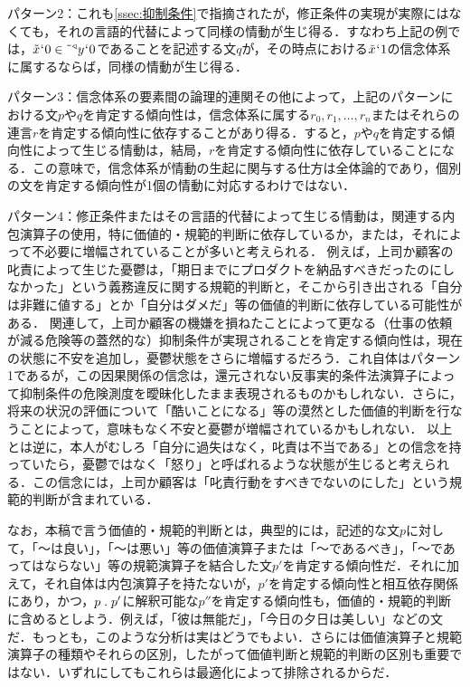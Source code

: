 パターン2：これも\ref{ssec:抑制条件}で指摘されたが，修正条件の実現が実際にはなくても，それの言語的代替によって同様の情動が生じ得る．すなわち上記の例では，$\tilde{x}{\mspace{1mu}{`}\mspace{1mu}} 0\in\tilde{\:\:}{^\triangleleft}y{\mspace{1mu}{`}\mspace{1mu}} 0$であることを記述する文$q$が，その時点における$ \tilde{x}{\mspace{1mu}{`}\mspace{1mu}} 1 $の信念体系に属するならば，同様の情動が生じ得る．

パターン3：信念体系の要素間の論理的連関その他によって，上記のパターンにおける文$p$や$q$を肯定する傾向性は，信念体系に属する$ r_0,r_1,\dots,r_n $またはそれらの連言$r$を肯定する傾向性に依存することがあり得る．すると，$p$や$q$を肯定する傾向性によって生じる情動は，結局，$r$を肯定する傾向性に依存していることになる．この意味で，信念体系が情動の生起に関与する仕方は全体論的であり，個別の文を肯定する傾向性が1個の情動に対応するわけではない．

パターン4：修正条件またはその言語的代替によって生じる情動は，関連する内包演算子の使用，特に価値的・規範的判断に依存しているか，または，それによって不必要に増幅されていることが多いと考えられる．
例えば，上司か顧客の叱責によって生じた憂鬱は，「期日までにプロダクトを納品すべきだったのにしなかった」という義務違反に関する規範的判断と，そこから引き出される「自分は非難に値する」とか「自分はダメだ」等の価値的判断に依存している可能性がある．
関連して，上司か顧客の機嫌を損ねたことによって更なる（仕事の依頼が減る危険等の蓋然的な）抑制条件が実現されることを肯定する傾向性は，現在の状態に不安を追加し，憂鬱状態をさらに増幅するだろう．これ自体はパターン1であるが，この因果関係の信念は，還元されない反事実的条件法演算子によって抑制条件の危険測度を曖昧化したまま表現されるものかもしれない．さらに，将来の状況の評価について「酷いことになる」等の漠然とした価値的判断を行なうことによって，意味もなく不安と憂鬱が増幅されているかもしれない．
以上とは逆に，本人がむしろ「自分に過失はなく，叱責は不当である」との信念を持っていたら，憂鬱ではなく「怒り」と呼ばれるような状態が生じると考えられる．この信念には，上司か顧客は「叱責行動をすべきでないのにした」という規範的判断が含まれている．

なお，本稿で言う価値的・規範的判断とは，典型的には，記述的な文$p$に対して，「〜は良い」，「〜は悪い」等の価値演算子または「〜であるべき」，「〜であってはならない」等の規範演算子を結合した文$p'$を肯定する傾向性だ．それに加えて，それ自体は内包演算子を持たないが，$p'$を肯定する傾向性と相互依存関係にあり，かつ，$p\con{1}p'$に解釈可能な$p''$を肯定する傾向性も，価値的・規範的判断に含めるとしよう．例えば，「彼は無能だ」，「今日の夕日は美しい」などの文だ．もっとも，このような分析は実はどうでもよい．さらには価値演算子と規範演算子の種類やそれらの区別，したがって価値判断と規範的判断の区別も重要ではない．いずれにしてもこれらは最適化によって排除されるからだ．

